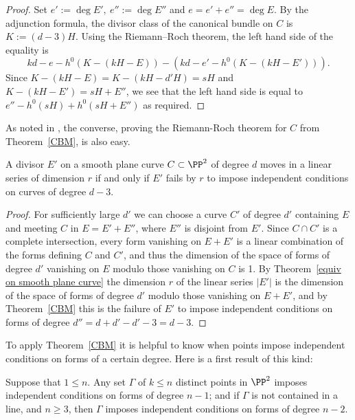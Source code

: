 \begin{proof}
Set $e' := \deg E', \ e'':= \deg E''$ and $e = e'+e'' = \deg E.$
By the adjunction formula, the divisor class of the canonical bundle on $C$ is $K := (d-3)H$. Using the Riemann--Roch theorem, the left hand side of the equality is
$$
kd-e-h^0(K - (kH-E)) - \left(kd-e' - h^0(K-(kH-E'))\right).
$$
Since $K - (kH-E) = K - (kH-d'H) = sH$ and  $K-(kH-E') = sH+E''$, we see that the 
left hand side is equal to 
$
e'' - h^0(sH) +  h^0(sH+E'')
$
as required.
\end{proof}

As noted in \cite{Threads}, the converse, proving the Riemann-Roch theorem for $C$ from Theorem~\ref{CBM}, is also easy.

\begin{corollary}\label{CBM cor 1}
A divisor $E'$ on a smooth plane curve $C\subset \PP^2$ of degree $d$ moves
in a linear series of dimension $r$ if and only if $E'$ fails by $r$ to impose
independent conditions on curves of degree $d-3$.
\end{corollary}

\begin{proof}
For sufficiently large $d'$ we can choose a curve $C'$ of degree $d'$ containing
$E$ and meeting $C$ in $E = E'+E''$, where $E''$ is disjoint from $E'$. Since $C\cap C'$
is a complete intersection, every form vanishing on $E+E'$ is a linear combination of
the forms defining $C$ and $C'$, and thus the dimension of the space of forms of degree $d'$
vanishing on $E$ modulo those vanishing on $C$ is 1. By Theorem~\ref{equiv on smooth plane curve} the dimension $r$ of the linear series $|E'|$ is the dimension of the space of
forms of degree $d'$ modulo those vanishing on $E+E'$, and by Theorem~\ref{CBM} this
is the failure of $E'$ to impose independent conditions on forms of degree
$d'' = d+d' - d' -3 = d-3$.
\end{proof}

To apply Theorem~\ref{CBM} it is helpful to know when points impose independent conditions on forms of a certain degree. Here is a first result of this kind:

\begin{proposition}\label{n-2 independence}
Suppose that $1\leq n$. Any set $\Gamma$ of $k\leq n$ distinct points in $\PP^{2}$ imposes independent conditions on forms of degree $n-1$; and if $\Gamma$ is not contained in a line, and $n\geq 3$, then $\Gamma$ imposes independent conditions on forms of degree $n-2$.
\end{proposition}


